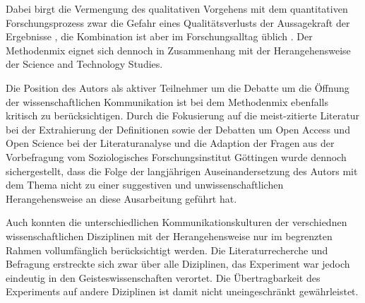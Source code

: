 Dabei birgt die Vermengung des qualitativen Vorgehens mit dem quantitativen Forschungsprozess zwar die Gefahr eines Qualitätsverlusts der Aussagekraft der Ergebnisse \cite{suchen_Lamek_1993_S_198}, die Kombination ist aber im Forschungsalltag üblich \cite{bortz_Doering_2006_Methoden}. Der Methodenmix eignet sich dennoch in Zusammenhang mit der Herangehensweise der Science and Technology Studies.

Die Position des Autors als aktiver Teilnehmer um die Debatte um die Öffnung der wissenschaftlichen Kommunikation ist bei dem Methodenmix ebenfalls kritisch zu berücksichtigen. Durch die Fokusierung auf die meist-zitierte Literatur bei der Extrahierung der Definitionen sowie der Debatten um Open Access und Open Science bei der Literaturanalyse und die Adaption der Fragen aus der Vorbefragung vom Soziologisches Forschungsinstitut Göttingen wurde dennoch sichergestellt, dass die Folge der langjährigen Auseinandersetzung des Autors mit dem Thema nicht zu einer suggestiven und unwissenschaftlichen Herangehensweise an diese Ausarbeitung geführt hat.

Auch konnten die unterschiedlichen Kommunikationskulturen der verschiednen wissenschaftlichen Disziplinen mit der Herangehensweise nur im begrenzten Rahmen vollumfänglich berücksichtigt werden. Die Literaturrecherche und Befragung erstreckte sich zwar über alle Diziplinen, das Experiment war jedoch eindeutig in den Geisteswissenschaften verortet. Die Übertragbarkeit des Experiments auf andere Diziplinen ist damit nicht uneingeschränkt gewährleistet.
